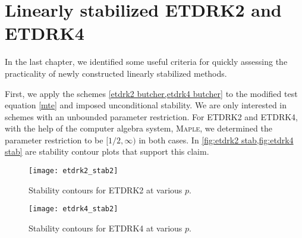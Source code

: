 \section{Linearly stabilized ETDRK2 and ETDRK4}
In the last chapter, we identified some useful criteria for quickly assessing the practicality of newly constructed linearly stabilized methods. 

First, we apply the schemes \cref{etdrk2 butcher,etdrk4 butcher} to the modified test equation \cref{mte} and imposed unconditional stability. We are only interested in schemes with an unbounded parameter restriction. For ETDRK2 and ETDRK4, with the help of the computer algebra system, \textsc{Maple}\textsuperscript{\texttrademark}, we determined the parameter restriction to be $[1/2, \infty)$ in both cases. In \cref{fig:etdrk2 stab,fig:etdrk4 stab} are stability contour plots that support this claim.

\begin{figure}[htb!]
	\centering
\texttt{[image: etdrk2\_stab2]}
\caption[Stability contours for ETDRK2 at various $p$]{Stability contours for ETDRK2 at various $p$.}
\label{fig:etdrk2 stab}
\end{figure}

\begin{figure}[htb!]
	\centering
\texttt{[image: etdrk4\_stab2]}
\caption[Stability contours for ETDRK4 at various $p$]{Stability contours for ETDRK4 at various $p$.}
\label{fig:etdrk4 stab}
\end{figure}

